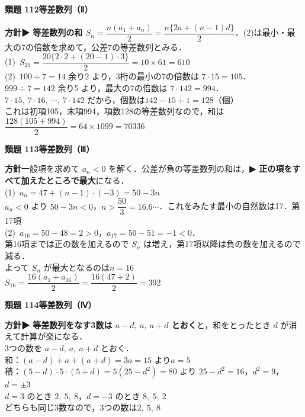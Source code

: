 \documentclass[a4paper,11pt]{ltjsarticle}
\newcommand{\ans}[2]{\Needspace{5\baselineskip}\vspace{6pt}%
  {\sffamily\bfseries 類題 #1\quad #2}\par}
\newcommand{\point}[1]{\textsf{\bfseries ▶ #1}}
\begin{document}
\ans{112}{等差数列（Ⅱ）}
\begin{kai}
\textbf{方針}\quad \point{等差数列の和 $S_n=\dfrac{n(a_1+a_n)}{2}=\dfrac{n\{2a+(n-1)d\}}{2}$}．(2)は最小・最大の7の倍数を求めて，公差7の等差数列とみる．\\[2pt]
(1)\ $S_{20}=\dfrac{20\{2\cdot2+(20-1)\cdot3\}}{2}=10\times61=610$\\[2pt]
(2)\ $100\div7=14$ 余り2 より，3桁の最小の7の倍数は $7\cdot15=105$．\\
\hspace*{1.5em}$999\div7=142$ 余り5 より，最大の7の倍数は $7\cdot142=994$．\\
\hspace*{1.5em}$7\cdot15,\ 7\cdot16,\ \cdots,\ 7\cdot142$ だから，個数は\quad $142-15+1=128$（個）\\
\hspace*{1.5em}これは初項105，末項994，項数128の等差数列なので，和は\\
\hspace*{1.5em}$\dfrac{128(105+994)}{2}=64\times1099=70336$
\end{kai}

\ans{113}{等差数列（Ⅲ）}
\begin{kai}
\textbf{方針}\quad 一般項を求めて $a_n<0$ を解く．公差が負の等差数列の和は，\point{正の項をすべて加えたところで最大}になる．\\[2pt]
(1)\ $a_n=47+(n-1)\cdot(-3)=50-3n$\\
\hspace*{1.5em}$a_n<0$ より $50-3n<0$，$n>\dfrac{50}3=16.6\cdots$．これをみたす最小の自然数は17．\quad 第17項\\[2pt]
(2)\ $a_{16}=50-48=2>0$，$a_{17}=50-51=-1<0$．\\
\hspace*{1.5em}第16項までは正の数を加えるので $S_n$ は増え，第17項以降は負の数を加えるので減る．\\
\hspace*{1.5em}よって $S_n$ が最大となるのは\quad $n=16$\\
\hspace*{1.5em}$S_{16}=\dfrac{16(a_1+a_{16})}2=\dfrac{16(47+2)}2=392$
\end{kai}

\ans{114}{等差数列（Ⅳ）}
\begin{kai}
\textbf{方針}\quad \point{等差数列をなす3数は $a-d,\ a,\ a+d$ とおく}と，和をとったとき $d$ が消えて計算が楽になる．\\[2pt]
3つの数を $a-d,\ a,\ a+d$ とおく．\\
和：$(a-d)+a+(a+d)=3a=15$ より\quad $a=5$\\
積：$(5-d)\cdot5\cdot(5+d)=5(25-d^2)=80$ より $25-d^2=16$，\quad $d^2=9$，\quad $d=\pm3$\\[2pt]
$d=3$ のとき $2,\ 5,\ 8$，\quad $d=-3$ のとき $8,\ 5,\ 2$\\
どちらも同じ3数なので，3つの数は\quad $2,\ 5,\ 8$
\end{kai}
\end{document}
